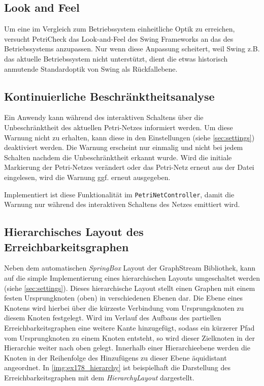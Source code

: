 \subsection{Look and Feel}
Um eine im Vergleich zum Betriebssystem einheitliche Optik zu erreichen,
versucht PetriCheck das Look-and-Feel des Swing Frameworks an das des
Betriebssystems anzupassen. Nur wenn diese Anpassung scheitert, weil Swing z.B.
das aktuelle Betriebssystem nicht unterstützt, dient die etwas historisch
anmutende Standardoptik von Swing als Rückfallebene.

\subsection{Kontinuierliche Beschränktheitsanalyse}
Ein Anwendy kann während des interaktiven Schaltens über die Unbeschränktheit
des aktuellen Petri-Netzes informiert werden. Um diese Warnung nicht zu
erhalten, kann diese in den Einstellungen (siehe \cref{sec:settings})
deaktiviert werden. Die Warnung erscheint nur einmalig und nicht bei jedem
Schalten nachdem die Unbeschränktheit erkannt wurde. Wird die initiale
Markierung der Petri-Netzes verändert oder das Petri-Netz erneut aus der Datei
eingelesen, wird die Warnung ggf. erneut ausgegeben.

Implementiert ist diese Funktionalität im \texttt{PetriNetController}, damit die
Warnung nur während des interaktiven Schaltens des Netzes emittiert wird.

\subsection{Hierarchisches Layout des Erreichbarkeitsgraphen}
Neben dem automatischen \emph{SpringBox} Layout der GraphStream Bibliothek, kann
auf die simple Implementierung eines hierarchischen Layouts umgeschaltet werden
(siehe \cref{sec:settings}). Dieses hierarchische Layout stellt einen Graphen
mit einem festen Ursprungknoten (oben) in verschiedenen Ebenen dar. Die Ebene
eines Knotens wird hierbei über die kürzeste Verbindung vom Ursprungsknoten zu
diesem Knoten festgelegt. Wird im Verlauf des Aufbaus des partiellen
Erreichbarkeitsgraphen eine weitere Kante hinzugefügt, sodass ein kürzerer Pfad
vom Ursprungknoten zu einem Knoten entsteht, so wird dieser Zielknoten in der
Hierarchie weiter nach oben gelegt. Innerhalb einer Hierarchieebene werden die
Knoten in der Reihenfolge des Hinzufügens zu dieser Ebene äquidistant
angeordnet. In \cref{img:ex178_hierarchy} ist beispielhaft die Darstellung des
Erreichbarkeitsgraphen mit dem \emph{HierarchyLayout} dargestellt.

